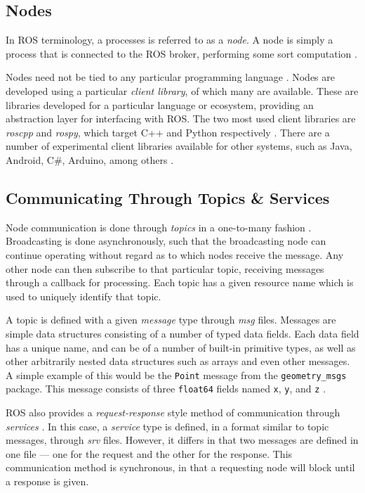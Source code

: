 \subsection{Nodes}
In ROS terminology, a processes is referred to as a \emph{node}. A node is simply a process that is connected to the ROS broker, performing some sort computation \cite{ros_paper}.

Nodes need not be tied to any particular programming language \cite{ros_paper}. Nodes are developed using a particular \emph{client library}, of which many are available. These are libraries developed for a particular language or ecosystem, providing an abstraction layer for interfacing with ROS. The two most used client libraries are \emph{roscpp} and \emph{rospy}, which target C++ and Python respectively \cite{ros_wiki_clientlibraries}. There are a number of experimental client libraries available for other systems, such as Java, Android, C\#, Arduino, among others \cite{ros_wiki_clientlibraries}.

\subsection{Communicating Through Topics \& Services}
Node communication is done through \emph{topics} in a one-to-many fashion \cite{ros_paper}. Broadcasting is done asynchronously, such that the broadcasting node can continue operating without regard as to which nodes receive the message. Any other node can then subscribe to that particular topic, receiving messages through a callback for processing. Each topic has a given resource name which is used to uniquely identify that topic.

A topic is defined with a given \emph{message} type through \emph{msg} files. Messages are simple data structures consisting of a number of typed data fields. Each data field has a unique name, and can be of a number of built-in primitive types, as well as other arbitrarily nested data structures such as arrays and even other messages. A simple example of this would be the \texttt{Point} message from the \texttt{geometry\_msgs} package. This message consists of three \texttt{float64} fields named \texttt{x}, \texttt{y}, and \texttt{z} \cite{ros_api_point_msg}.

ROS also provides a \emph{request-response} style method of communication through \emph{services} \cite{ros_wiki_services}. In this case, a \emph{service} type is defined, in a format similar to topic messages, through \emph{srv} files. However, it differs in that two messages are defined in one file --- one for the request and the other for the response. This communication method is synchronous, in that a requesting node will block until a response is given. 

